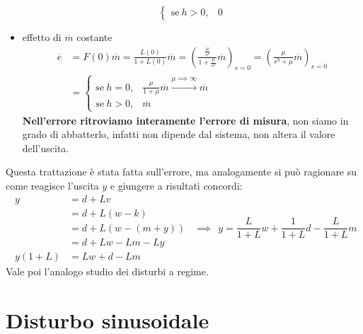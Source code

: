 \begin{itemize}
\begin{equation*}
\begin{cases}
	      \text{se} \ h >0, & 0
	\end{cases}
	\end{equation*}
	\item effetto di $\overline{m}$ costante\begin{equation*}
	      \begin{aligned}
	      	\overline{e}      & =F(0)\overline{m} =\frac{L(0)}{1+L(0)}\overline{m} =\left(\frac{\frac{\mu }{s^h}}{1+\frac{\mu }{s^h}}\overline{m}\right)_{s=0} =\left(\frac{\mu }{s^h +\mu }\overline{m}\right)_{s=0} \\
	      	                  & =\begin{cases}                                                                                                                                                                        
	      	\text{se} \ h=0,  & \frac{\mu }{1+\mu }\overline{m}\xrightarrow{\mu \implies \infty }\overline{m}                                                                                                      \\
	      	\text{se} \ h >0, & \overline{m}                                                                                                                                                                          
	      	\end{cases}
	      \end{aligned}
	\end{equation*}\textbf{Nell'errore ritroviamo interamente l'errore di misura}, non siamo in grado di abbatterlo, infatti non dipende dal sistema, non altera il valore dell'uscita.
\end{itemize}

Questa trattazione è stata fatta sull'errore, ma analogamente si può ragionare su come reagisce l'uscita $y$ e giungere a risultati concordi:
\begin{equation*}
	\begin{aligned}
		y      & =d+Lv         \\
		       & =d+L(w-k)     \\
		       & =d+L(w-(m+y)) \\
		       & =d+Lw-Lm-Ly   \\
		y(1+L) & =Lw+d-Lm      
	\end{aligned} \ \ \implies \ \ \boxed{y=\frac{L}{1+L} w+\frac{1}{1+L} d-\frac{L}{1+L} m}
\end{equation*}
Vale poi l'analogo studio dei disturbi a regime.

\section{Disturbo sinusoidale}

